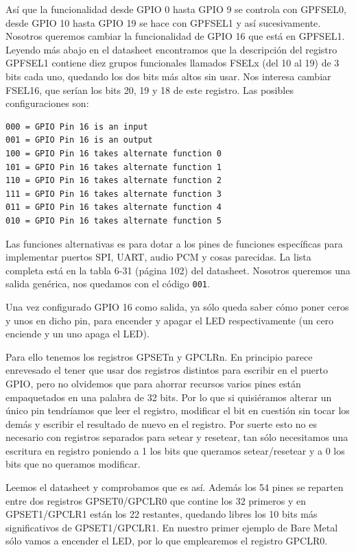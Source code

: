 Así que la funcionalidad desde GPIO 0 hasta GPIO 9 se controla con
GPFSEL0, desde GPIO 10 hasta GPIO 19 se hace con GPFSEL1 y así
sucesivamente. Nosotros queremos cambiar la funcionalidad de GPIO 16
que está en GPFSEL1. Leyendo más abajo en el datasheet encontramos que
la descripción del registro GPFSEL1 contiene diez grupos funcionales
llamados FSELx (del 10 al 19) de 3 bits cada uno, quedando los dos bits
más altos sin usar. Nos interesa cambiar FSEL16, que serían los bits
20, 19 y 18 de este registro. Las posibles configuraciones son:

\begin{lstlisting}
000 = GPIO Pin 16 is an input
001 = GPIO Pin 16 is an output
100 = GPIO Pin 16 takes alternate function 0
101 = GPIO Pin 16 takes alternate function 1
110 = GPIO Pin 16 takes alternate function 2
111 = GPIO Pin 16 takes alternate function 3
011 = GPIO Pin 16 takes alternate function 4
010 = GPIO Pin 16 takes alternate function 5
\end{lstlisting}

Las funciones alternativas es para dotar a los pines de funciones específicas
para implementar puertos SPI, UART, audio PCM y cosas parecidas. La lista completa
está en la tabla 6-31 (página 102) del datasheet. Nosotros queremos una salida
genérica, nos quedamos con el código {\tt 001}.

Una vez configurado GPIO 16 como salida, ya sólo queda saber cómo poner ceros y unos
en dicho pin, para encender y apagar el LED respectivamente (un cero enciende y un uno
apaga el LED).

Para ello tenemos los registros GPSETn y GPCLRn. En principio parece enrevesado el tener
que usar dos registros distintos para escribir en el puerto GPIO, pero no olvidemos que
para ahorrar recursos varios pines están empaquetados en una palabra de 32 bits. Por lo
que si quisiéramos alterar un único pin tendríamos que leer el registro, modificar el bit
en cuestión sin tocar los demás y escribir el resultado de nuevo en el registro. Por suerte
esto no es necesario con registros separados para setear y resetear, tan sólo necesitamos
una escritura en registro poniendo a 1 los bits que queramos setear/resetear y a 0 los bits
que no queramos modificar.

Leemos el datasheet y comprobamos que es así. Además los 54 pines se reparten entre dos
registros GPSET0/GPCLR0 que contine los 32 primeros y en GPSET1/GPCLR1 están los 22
restantes, quedando libres los 10 bits más significativos de GPSET1/GPCLR1. En nuestro
primer ejemplo de Bare Metal sólo vamos a encender el LED, por lo que emplearemos el
registro GPCLR0.


